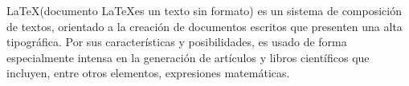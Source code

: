 \documentclass{book}
\begin{document}

\LaTeX (documento \LaTeX es un texto sin formato) es un sistema          de composición de \hspace{1cm} textos, orientado a la creación de documentos escritos que presenten una alta \hspace{-1cm} tipográfica. 
\vspace{1cm} 
Por sus características y posibilidades, es usado de forma especialmente intensa en la generación de artículos y libros científicos que incluyen, entre otros elementos, expresiones matemáticas.
\end{document}

